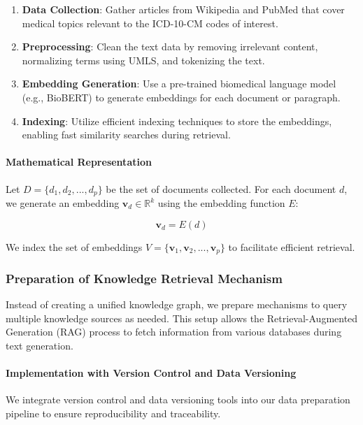 \documentclass[12pt, a4paper]{article}
\begin{document}
\begin{enumerate}
    \item \textbf{Data Collection}: Gather articles from Wikipedia and PubMed that cover medical topics relevant to the ICD-10-CM codes of interest.
    \item \textbf{Preprocessing}: Clean the text data by removing irrelevant content, normalizing terms using UMLS, and tokenizing the text.
    \item \textbf{Embedding Generation}: Use a pre-trained biomedical language model (e.g., BioBERT) to generate embeddings for each document or paragraph.
    \item \textbf{Indexing}: Utilize efficient indexing techniques to store the embeddings, enabling fast similarity searches during retrieval.
\end{enumerate}

\paragraph{Mathematical Representation}

Let \( D = \{d_1, d_2, ..., d_p\} \) be the set of documents collected. For each document \( d \), we generate an embedding \( \mathbf{v}_d \in \mathbb{R}^k \) using the embedding function \( E \):

\[
\mathbf{v}_d = E(d)
\]

We index the set of embeddings \( V = \{\mathbf{v}_1, \mathbf{v}_2, ..., \mathbf{v}_p\} \) to facilitate efficient retrieval.

\subsubsection{Preparation of Knowledge Retrieval Mechanism}

Instead of creating a unified knowledge graph, we prepare mechanisms to query multiple knowledge sources as needed. This setup allows the Retrieval-Augmented Generation (RAG) process to fetch information from various databases during text generation.

\paragraph{Implementation with Version Control and Data Versioning}

We integrate version control and data versioning tools into our data preparation pipeline to ensure reproducibility and traceability.
\end{document}

